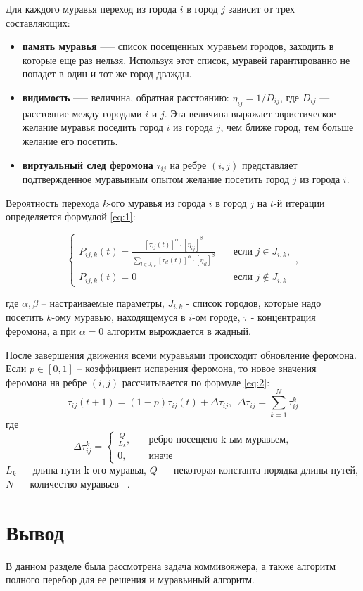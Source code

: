 Для каждого муравья переход из города $i$ в город $j$ зависит от трех
составляющих:
\begin{itemize}
    \item \textbf{память муравья} —-- список посещенных муравьем городов,
        заходить в которые еще раз нельзя. Используя этот список, муравей
        гарантированно не попадет в один и тот же город дважды.
    \item \textbf{видимость} —-- величина, обратная расстоянию: $\eta_{ij} = 1 / D_{ij}$,
        где $D_{ij}$ — расстояние между городами $i$ и $j$. Эта величина
        выражает эвристическое желание муравья поседить город $i$ из города
        $j$, чем ближе город, тем больше желание его посетить.
    \item \textbf{виртуальный след феромона} $\tau_{ij}$ на ребре $(i, j)$ представляет
        подтвержденное муравьиным опытом желание посетить город $j$ из города
        $i$.
\end{itemize}

Вероятность перехода $k$-ого муравья из города $i$ в город $j$ на $t$-й
итерации определяется формулой \ref{eq:1}:

\begin{equation}\label{eq:1}
      \begin{cases}
          P_{ij,k}(t) = \frac{[\tau_{ij}(t)]^{\alpha} \cdot
                        [\eta_{ij}]^{\beta}}{\displaystyle\sum_{l \in
                        J_{i,k}}[\tau_{il}(t)]^{\alpha} \cdot
                        [\eta_{il}]^{\beta}} & \quad \text{если } j \in
                        J_{i,k},\\
          P_{ij,k}(t) = 0 & \quad \text{если } j \notin J_{i,k}
      \end{cases}
      ,
\end{equation}

где $\alpha, \beta$ -- настраиваемые параметры, $J_{i,k}$ - список городов,
которые надо посетить $k$-ому муравью, находящемуся в $i$-ом городе, $\tau$ -
концентрация феромона, а при $\alpha = 0$ алгоритм вырождается в жадный.

После завершения движения всеми муравьями происходит обновление феромона.
Если $p \in [0, 1]$ -- коэффициент испарения феромона, то новое значения
феромона на ребре $(i,j)$ рассчитывается по формуле \ref{eq:2}:
\begin{equation}\label{eq:2}
    \tau_{ij}(t+1) = (1-p)\tau_{ij}(t) + \Delta \tau_{ij},~~\Delta \tau_{ij} =
                     \displaystyle\sum_{k=1}^N \tau^k_{ij}
\end{equation}
где
\begin{equation}\label{eq:3}
    \Delta \tau^k_{ij} = \begin{cases}
        \frac{Q}{L_k}, & \quad \textrm{ребро посещено k-ым муравьем,} \\
        0, & \quad \textrm{иначе}
    \end{cases}
\end{equation}
$L_{k}$ — длина пути k-ого муравья, $Q$ — некоторая константа порядка длины
путей, $N$ — количество муравьев ~\cite{Shtovba}.

\section*{Вывод}

В данном разделе была рассмотрена задача коммивояжера, а также алгоритм полного
перебор для ее решения и муравьиный алгоритм.
